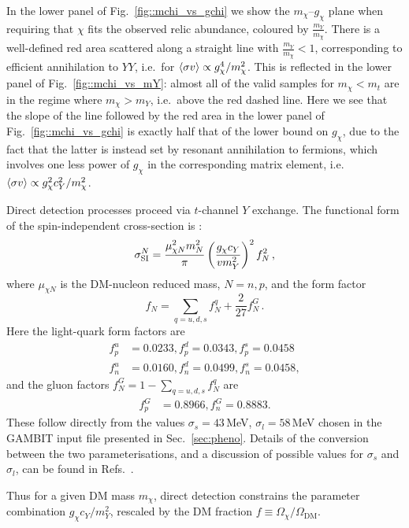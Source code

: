 \documentclass[pdftex,twocolumn,epjc3_preprint,runningheads]{svjour3}
\renewcommand{\_}{\discretionary{\underscore}{}{\underscore}}
\newcommand{\ie}{i.e.\ }
\newcommand{\gambit}{\textsf{GAMBIT}\xspace}
\newcommand{\GB}{\gambit}
\begin{document}
In the lower panel of Fig.~\ref{fig::mchi_vs_gchi} we show the $m_\chi$--$g_\chi$ plane when requiring that $\chi$ fits the observed relic abundance, coloured by $\frac{m_Y}{m_\chi}$. There is a well-defined red area scattered along a straight line with $\frac{m_Y}{m_\chi} < 1$, corresponding to efficient annihilation to $YY$, \ie for $\braket{\sigma v} \propto g_\chi^4/m_\chi^2$.  This is reflected in the lower panel of Fig.~\ref{fig::mchi_vs_mY}: almost all of the valid samples for $m_\chi < m_t$ are in the regime where $m_\chi > m_Y$, \ie above the red dashed line. Here we see that the slope of the line followed by the red area in the lower panel of Fig.~\ref{fig::mchi_vs_gchi} is exactly half that of the lower bound on $g_\chi$, due to the fact that the latter is instead set by resonant annihilation to fermions, which involves one less power of $g_\chi$ in the corresponding matrix element, \ie $\braket{\sigma v} \propto g_\chi^2
c_Y^2 / m_\chi^2$.

Direct detection processes proceed via $t$-channel $Y$ exchange. The functional form of the spin-independent cross-section is \cite[e.g.][]{Abdallah:2015ter}:
\begin{equation}
  \sigma_{\rm SI}^{N} = \frac{\mu_{\chi N}^2 m_N^2}{\pi}\left(\frac{g_\chi c_Y}{v m_Y^2}\right)^2 f_N^2\,,
\end{equation}
where $\mu_{\chi N}$ is the DM-nucleon reduced mass, $N=n,p$, and the form factor
\begin{equation}
f_N = \sum_{q=u,d,s} f^q_{N} + \frac{2}{27}f^G_N\,.
\end{equation}
Here the light-quark form factors are
\begin{align}
  f_p^u &= 0.0233, f_p^d = 0.0343, f_p^s = 0.0458 \\
  f_n^u &= 0.0160, f_n^d = 0.0499, f_n^s = 0.0458,
\end{align}
and the gluon factors $f^G_N = 1-\sum_{q=u,d,s} f^q_{N}$ are
\begin{align}
  f^G_p &= 0.8966, f^G_n = 0.8883.
\end{align}
These follow directly from the values $\sigma_s=43$\,MeV, $\sigma_l=58$\,MeV chosen in the \GB input file presented in Sec.\ \ref{sec:pheno}. Details of the conversion between the two parameterisations, and a discussion of possible values for $\sigma_s$ and $\sigma_l$, can be found in Refs.\ \cite{DarkBit,Cline:2013gha}.

Thus for a given DM mass $m_\chi$, direct detection constrains the parameter combination $g_\chi c_Y/m_Y^2$, rescaled by the DM fraction $f \equiv \Omega_\chi/\Omega_{\mathrm{DM}}$.
\end{document}
